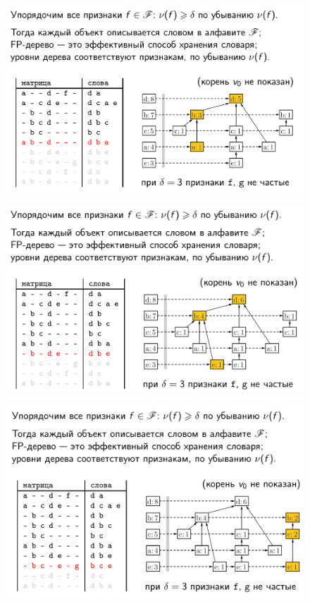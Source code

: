 \documentclass{beamer}
\begin{document}
\begin{frame}
	\begin{figure}[h]
		\centering
		\includegraphics[scale=0.45]{images/lec08-pic38.png}
	\end{figure}
\end{frame}

\begin{frame}
	\begin{figure}[h]
		\centering
		\includegraphics[scale=0.45]{images/lec08-pic39.png}
	\end{figure}
\end{frame}

\begin{frame}
	\begin{figure}[h]
		\centering
		\includegraphics[scale=0.45]{images/lec08-pic40.png}
	\end{figure}
\end{frame}
\end{document}
